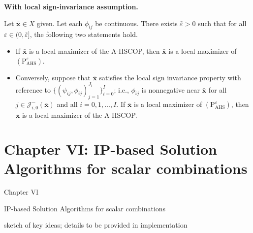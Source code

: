 \documentclass[aspectratio=169,xcolor=dvipsnames]{beamer}
\begin{document}
\begin{frame}
  \small
  \setlength{\parskip}{0pt}

  \textbf{With local sign-invariance assumption.}

  \vspace{0.10cm}
  Let $\bar{\mathbf{x}}\in X$ given. Let each $\phi_{ij}$ be continuous. There
  exists $\bar{\varepsilon}>0$ such that for all
  $\varepsilon\in(0,\bar{\varepsilon}]$, the following two statements hold.

  \vspace{0.10cm}
  \begin{itemize}
    \setlength{\itemsep}{0.14cm}
    \item[(A)] If $\bar{\mathbf{x}}$ is a local maximizer of the A-HSCOP, then
      $\bar{\mathbf{x}}$ is a local maximizer of
      $(\mathrm{P}^\varepsilon_{\mathrm{AHS}})$.
    \item[(B)] Conversely, suppose that $\bar{\mathbf{x}}$ satisfies the local
      sign invariance property with reference to
      $\bigl\{(\psi_{ij},\phi_{ij})_{j=1}^{J_i}\bigr\}_{i=0}^{I}$; i.e.,
      $\phi_{ij}$ is nonnegative near $\bar{\mathbf{x}}$ for all
      $j\in\mathcal{J}_{i,0}^-(\bar{\mathbf{x}})$ and all $i=0,1,\ldots,I$.
      If $\bar{\mathbf{x}}$ is a local maximizer of
      $(\mathrm{P}^\varepsilon_{\mathrm{AHS}})$, then $\bar{\mathbf{x}}$ is a
      local maximizer of the A-HSCOP.
  \end{itemize}
\end{frame}

\section{Chapter VI: IP-based Solution Algorithms for scalar combinations}

\begin{frame}[plain]
  \hypertarget{chapter-ip-algorithms}{}
  \centering
  \vfill
  {Chapter VI\par}
  \vspace{0.34cm}
  {\mdseries\large
    IP-based Solution Algorithms for scalar combinations\par}
  \vspace{0.24cm}
  {\normalsize\mdseries
    sketch of key ideas; details to be provided in implementation\par}
  \vfill
\end{frame}
\end{document}

